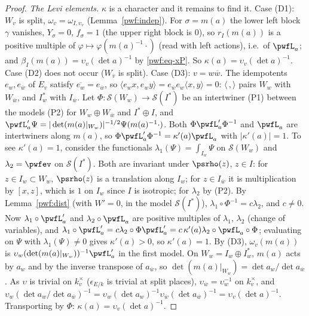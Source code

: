 \documentclass[10pt]{amsart}
\theoremstyle{definition}
\theoremstyle{remark}
\providecommand{\auS}{\mathcal S}
\providecommand{\aubar}[1]{\overline{#1}}
\begin{document}
\begin{proof}
\emph{The Levi elements.} $\kappa$ is a character and it remains to find it. Case (D1): $W_v$ is
split, $\omega_v=\omega_{I,\upsilon_v}$ (Lemma~\ref{pwf:indep}). For $\sigma=m(a)$ the lower left
block $\gamma$ vanishes, $Y_\sigma=0$, $f_\sigma=1$ (the upper right block is $0$), so $r_I(m(a))$ is a
positive multiple of $\varphi\mapsto\varphi(m(a)^{-1}\cdot)$ (read with left actions), i.e.\ of
$\pwfL_a$; and $\beta_I(m(a))=\upsilon_v(\det a)^{-1}$ by \eqref{pwf:eq-xP}. So $\kappa(a)=
\upsilon_v(\det a)^{-1}$. Case (D2) does not occur ($W_v$ is split). Case (D3): $v=w\aubar w$. The
idempotents $e_w,e_{\aubar w}$ of $E_v$ satisfy $\aubar{e_w}=e_{\aubar w}$, so
$\langle e_wx,e_wy\rangle=e_{\aubar w}e_w\langle x,y\rangle=0$: $\langle\,,\rangle$ pairs $W_w$ with
$W_{\aubar w}$, and $I^*_w$ with $I_{\aubar w}$. Let $\Phi\colon\auS(W_w)\to\auS(I^*)$ be an
intertwiner (P1) between the models (P2) for $W_w\oplus W_{\aubar w}$ and $I^*\oplus I$, and
$\pwfL'_a\Psi=|\det(m(a)|_{W_w})|^{-1/2}\Psi(m(a)^{-1}\cdot)$. Both $\Phi\pwfL'_a\Phi^{-1}$ and
$\pwfL_a$ are intertwiners along $m(a)$, so $\Phi\pwfL'_a\Phi^{-1}=\kappa'(a)\pwfL_a$ with
$|\kappa'(a)|=1$. To see $\kappa'(a)=1$, consider the functionals $\lambda_1(\Psi)=\int_{I_w}\Psi$ on
$\auS(W_w)$ and $\lambda_2=\pwfev$ on $\auS(I^*)$. Both are invariant under $\psrho(z)$, $z\in I$:
for $z\in I_w\subset W_w$, $\psrho(z)$ is a translation along $I_w$; for $z\in I_{\aubar w}$ it is
multiplication by $[x,z]$, which is $1$ on $I_w$ since $I$ is isotropic; for $\lambda_2$ by (P2). By
Lemma~\ref{pwf:dist} (with $W'=0$, in the model $\auS(I^*)$), $\lambda_1\circ\Phi^{-1}=c\lambda_2$,
and $c\ne0$. Now $\lambda_1\circ\pwfL'_a$ and $\lambda_2\circ\pwfL_a$ are positive multiples of
$\lambda_1$, $\lambda_2$ (change of variables), and $\lambda_1\circ\pwfL'_a=c\lambda_2\circ\Phi\pwfL'_a=
c\,\kappa'(a)\lambda_2\circ\pwfL_a\circ\Phi$; evaluating on $\Psi$ with $\lambda_1(\Psi)\ne0$ gives
$\kappa'(a)>0$, so $\kappa'(a)=1$. By (D3), $\omega_v(m(a))$ is $\upsilon_w(\det(m(a)|_{W_w}))^{-1}
\pwfL'_a$ in the first model. On $W_w=I_w\oplus I^*_w$, $m(a)$ acts by $a_w$ and by the inverse
transpose of $a_{\aubar w}$, so $\det(m(a)|_{W_w})=\det a_w/\det a_{\aubar w}$. As $\upsilon$ is
trivial on $k_v^\times$ ($\epsilon_{E/k}$ is trivial at split places), $\upsilon_{\aubar w}=
\upsilon_w^{-1}$ on $k_v^\times$, and $\upsilon_w(\det a_w/\det a_{\aubar w})^{-1}=\upsilon_w(\det
a_w)^{-1}\upsilon_{\aubar w}(\det a_{\aubar w})^{-1}=\upsilon_v(\det a)^{-1}$. Transporting by
$\Phi$: $\kappa(a)=\upsilon_v(\det a)^{-1}$.
\end{proof}
\end{document}
